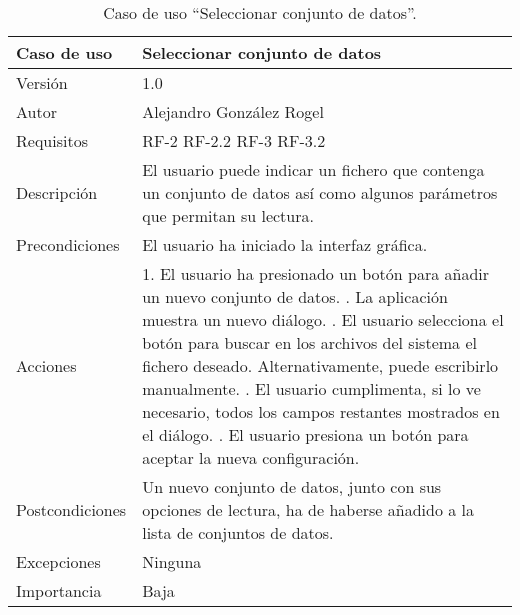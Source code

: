   \begin{table}
  \begin{center}
   \begin{tabular}{|>{} L{3cm} | L{9cm} |}
    \hline
    Caso de uso & Seleccionar conjunto de datos\\
    \hline
    Versión & 1.0 \\
    \hline
    Autor & Alejandro González Rogel \\
    \hline
    Requisitos & RF-2\newline
    				 RF-2.2\newline
    				 RF-3\newline
    				 RF-3.2 \\
    \hline
    Descripción & El usuario puede indicar un fichero que contenga un conjunto de datos así como algunos parámetros que permitan su lectura. \\
    \hline
    Precondiciones & El usuario ha iniciado la interfaz gráfica.\\
    \hline
    Acciones & 1. El usuario ha presionado un botón para añadir un nuevo conjunto de datos. . La aplicación muestra un nuevo diálogo. . El usuario selecciona el botón para buscar en los archivos del sistema el fichero deseado. Alternativamente, puede escribirlo manualmente. . El usuario cumplimenta, si lo ve necesario, todos los campos restantes mostrados en el diálogo. . El usuario presiona un botón para aceptar la nueva configuración. \\
    \hline
    Postcondiciones & Un nuevo conjunto de datos, junto con sus opciones de lectura, ha de haberse añadido a la lista de conjuntos de datos. \\
    \hline
    Excepciones & Ninguna \\
    \hline
    Importancia & Baja \\
    \hline
   \end{tabular}
   \caption{Caso de uso ``Seleccionar conjunto de datos''.}
   \label{tabla:casoUso6}
  \end{center}
 \end{table}
 
